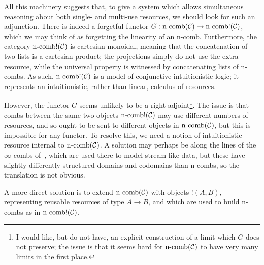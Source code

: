 All this machinery suggests that, to give a system which allows simultaneous
reasoning about both single- and multi-use resources, we should look for
such an adjunction. There is indeed a forgetful functor $G: \operatorname*{n-comb}({\mathcal{C}})\to
\operatorname*{n-comb!}({\mathcal{C}})$, which we may think of as forgetting the linearity of an
n-comb. Furthermore, the category $\operatorname*{n-comb!}({\mathcal{C}})$ is cartesian monoidal,
meaning that the concatenation of two lists is a cartesian product; the
projections simply do not use the extra resource, while the universal property is
witnessed by concatenating lists of n-combs. As such, $\operatorname*{n-comb!}({\mathcal{C}})$ is a
model of conjunctive intuitionistic logic; it represents an intuitionistic,
rather than linear, calculus of resources.

However, the functor $G$ seems unlikely to be a right adjoint\footnote{
  I would like, but do not have, an explicit construction of a limit which $G$
  does not preserve; the issue is that it seems hard for $\operatorname*{n-comb}({\mathcal{C}})$ to
  have very many limits in the first place.
}. The issue is that combs between the same two objects $\operatorname*{n-comb!}({\mathcal{C}})$ may
use different numbers of resources, and so ought to be sent to different objects
in $\operatorname*{n-comb}({\mathcal{C}})$, but this is impossible for any functor. To resolve this,
we need a notion of intuitionistic resource internal to $\operatorname*{n-comb}({\mathcal{C}})$. A solution
may perhaps be along the lines of the $\infty$-combs of~\cite{roman-2020}, which
are used there to model stream-like data, but these have slightly
differently-structured domains and codomains than n-combs, so the translation is
not obvious.

A more direct solution is to extend $\operatorname*{n-comb}({\mathcal{C}})$ with objects $!(A, B)$,
representing reusable resources of type $A\to B$, and which are used to build
n-combs as in $\operatorname*{n-comb!}({\mathcal{C}})$.


